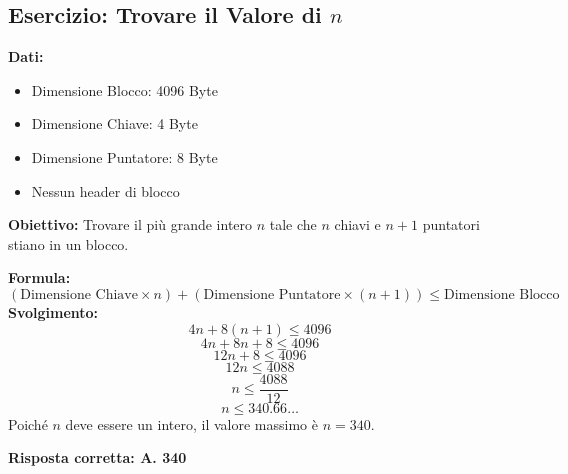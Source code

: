 \subsection{Esercizio: Trovare il Valore di \texorpdfstring{$n$}{n}}
\textbf{Dati:}
\begin{itemize}
    \item Dimensione Blocco: 4096 Byte
    \item Dimensione Chiave: 4 Byte
    \item Dimensione Puntatore: 8 Byte
    \item Nessun header di blocco
\end{itemize}
\textbf{Obiettivo:} Trovare il più grande intero $n$ tale che $n$ chiavi e $n+1$ puntatori stiano in un blocco.

\textbf{Formula:}
\[ (\text{Dimensione Chiave} \times n) + (\text{Dimensione Puntatore} \times (n+1)) \leq \text{Dimensione Blocco} \]
\textbf{Svolgimento:}
\[ 4n + 8(n+1) \leq 4096 \]
\[ 4n + 8n + 8 \leq 4096 \]
\[ 12n + 8 \leq 4096 \]
\[ 12n \leq 4088 \]
\[ n \leq \frac{4088}{12} \]
\[ n \leq 340.66\ldots \]
Poiché $n$ deve essere un intero, il valore massimo è $n = 340$.

\textbf{Risposta corretta: A. 340}


